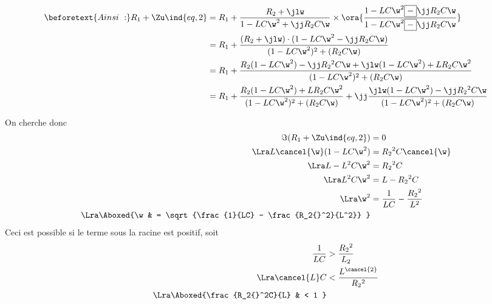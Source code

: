 \documentclass[../TDE6_rsf.tex]{subfiles}%
\begin{document}
{\begin{align*}
		\beforetext{Ainsi~:}
		R_1 + \Zu\ind{eq,2} & =
		R_1 + \frac{R_2 + \jlw}{1 - LC\w^2 + \jj R_2C\w} \times
		\ora{\frac{1 - LC\w^2 \boxed{-}\jj R_2C\w}{1 - LC\w^2 \boxed{-}\jj R_2C\w}}
		\\
		                    & =
		R_1 +
		\frac{%
			(R_2+\jlw)\cdot (1 - LC\w^2 - \jj R_2C\w)
		}{%
			(1-LC\w^2)^2 + (R_2C\w)
		}
		\\&=
		R_1 + \frac{%
		R_2 (1-LC\w^2)-\jj R_2{}^2C\w + \jlw (1-LC\w^2) + LR_2C\w^2
		}{%
		(1-LC\w^2)^2 + (R_2C\w)
		}
		\\&=
		R_1 +
		\frac{R_2 (1-LC\w^2) + LR_2C\w^2}{(1-LC\w^2)^2 + (R_2C\w)} +
		\jj \frac{\jlw (1-LC\w^2) -\jj R_2{}^2C\w}{(1-LC\w^2)^2 + (R_2C\w)}
	\end{align*}
	\begin{isd}
		On cherche donc
		\begin{align*}
			\Im(R_1 + \Zu\ind{eq,2}) & = 0
			\\\Lra
			L \cancel{\w} (1-LC\w^2) & = R_2{}^2C \cancel{\w}
			\\\Lra
			L - L^2 C\w^2            & = R_2{}^2C
			\\\Lra
			L^2C\w^2                 & = L - R_2{}^2C
			\\\Lra
			\w^2                     & = \frac{1}{LC} - \frac{R_2{}^2}{L^2}
			\\\Lra
			\Aboxed{%
			\w                       & = \sqrt{\frac{1}{LC} - \frac{R_2{}^2}{L^2}}
			}
		\end{align*}
		\tcblower
		Ceci est possible si le terme sous la racine est positif, soit
		\begin{align*}
			\frac{1}{LC}       & > \frac{R_2{}^2}{L_2}
			\\\Lra
			\cancel{L}C        & < \frac{L^{\cancel{2}}}{R_2{}^2}
			\\\Lra
			\Aboxed{%
			\frac{R_2{}^2C}{L} & < 1
			}
		\end{align*}
	\end{isd}
	\vspace{-15pt}
}
\end{document}
